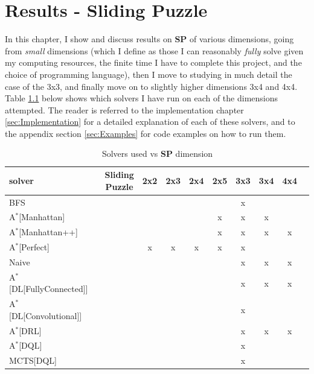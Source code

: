 \chapter{Results - Sliding Puzzle} %

\label{sec:ResultsSP} %


In this chapter, I show and discuss results on \textbf{SP} of various dimensions, going from \textit{small} dimensions (which I define as those I can reasonably \textit{fully} solve given my computing resources, the finite time I have to complete this project, and the choice of programming language), then I move to studying in much detail the case of the 3x3, and finally move on to slightly higher dimensions 3x4 and 4x4. Table \ref{tab:gridSP} below shows which solvers I have run on each of the dimensions attempted. The reader is referred to the implementation chapter \ref{sec:Implementation} for a detailed explanation of each of these solvers, and to the appendix section \ref{sec:Examples} for code examples on how to run them.

\begin{table}[H]
\begin{center}
\begin{tabular}{l*{9}{c}r}
\hline
\textbf{solver}      & & \textbf{Sliding Puzzle} & \textbf{2x2} & \textbf{2x3} & \textbf{2x4} & \textbf{2x5}  & \textbf{3x3} & \textbf{3x4} & \textbf{4x4} \\ 
\hline
BFS   & & & & & & &  x  & & \\
\hline
A$^{*}$[Manhattan]   & & & & & &  x  &  x  &  x  & \\
\hline
A$^{*}$[Manhattan++]   & & & & & &  x  &  x  &  x  & x \\
\hline
A$^{*}$[Perfect]   & & &  x  &  x  &  x  &  x  &  x  & & \\
\hline
Naive   & & & & & & &  x  &  x  & x \\
\hline
A$^{*}$[DL[FullyConnected]]   & & & & & & &  x  &  x  & x \\
\hline
A$^{*}$[DL[Convolutional]]   & & & & & & &  x  &  & \\
\hline
A$^{*}$[DRL]   & & & & & & &  x  &  x  & x \\
\hline
A$^{*}$[DQL]   & & & & & & &  x  & & \\
\hline
MCTS[DQL]        & & & & & & &  x  & & \\
\end{tabular}
\caption{\label{tab:gridSP} Solvers used vs \textbf{SP} dimension}
\end{center}
\end{table}

